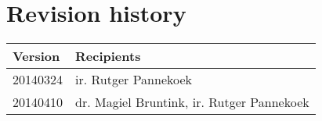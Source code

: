 \chapter*{Revision history}

\begin{tabular}{| p{3cm} | p{12cm} |}
	\hline
	\bfseries{Version} & \bfseries{Recipients} \\ \hline
	20140324 & ir. Rutger Pannekoek \\ \hline
	20140410 & dr. Magiel Bruntink, ir. Rutger Pannekoek \\
	\hline
\end{tabular}
